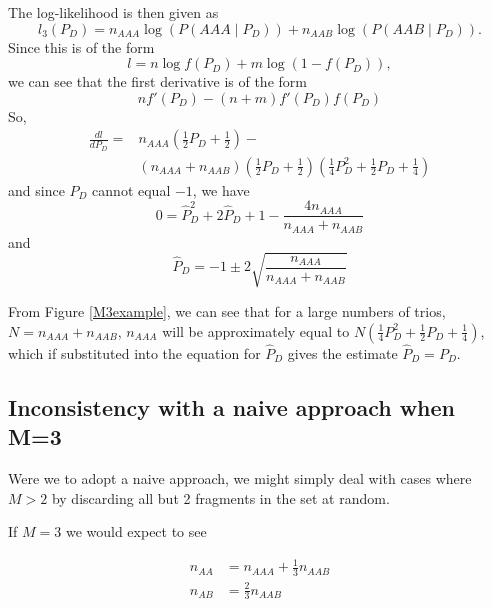 \documentclass{article}
\begin{document}
The log-likelihood is then given as
\begin{equation}
l_3(P_D) = n_{AAA} \log(P(AAA \mid P_D)) + n_{AAB} \log(P(AAB \mid P_D)). 
\end{equation}
\noindent Since this is of the form 
\begin{equation}
l = n \log f(P_D) + m \log (1-f(P_D)),
\end{equation}
\noindent we can see that the first derivative is of the form 
\begin{equation}
n f'(P_D) - (n+m)f'(P_D)f(P_D)
\end{equation}
\noindent So, 
\begin{equation}
\begin{split}
\frac{dl}{dP_D}=&n_{AAA}(\frac{1}{2}P_D+\frac{1}{2}) - \\&(n_{AAA}+n_{AAB})(\frac{1}{2}P_D+\frac{1}{2})(\frac{1}{4}P_D^2+\frac{1}{2}P_D+\frac{1}{4})
\end{split}
\end{equation}
\noindent and since $P_D$ cannot equal $-1$, we have 
\begin{equation}
0 = \hat{P}_D^2 + 2\hat{P}_D + 1 -\frac{4n_{AAA}}{n_{AAA}+n_{AAB}}
\end{equation}
\noindent and
\begin{equation} \label{eq:M3}
\hat{P}_D = -1 \pm 2\sqrt{\frac{n_{AAA}}{n_{AAA}+n_{AAB}}}
\end{equation}

From Figure \ref{M3example}, we can see that for a large numbers of trios, $N = n_{AAA} + n_{AAB}$, $n_{AAA}$ will be approximately equal to $N (\frac{1}{4}P_D^2+\frac{1}{2}P_D+\frac{1}{4})$, which if substituted into the equation for $\hat{P}_D$ gives the estimate $\hat{P}_D = P_D$.

\subsection{Inconsistency with a naive approach when M=3}

Were we to adopt a naive approach, we might simply deal with cases where $M > 2$ by discarding all but 2 fragments in the set at random.

If $M=3$ we would expect to see 

\begin{align}
n_{AA} &= n_{AAA}+\frac{1}{3}n_{AAB}\\
n_{AB} &= \frac{2}{3}n_{AAB}
\end{align}
\end{document}
